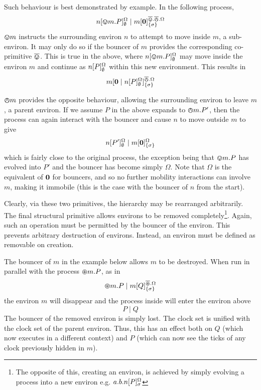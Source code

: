 \documentclass{acm_proc_article-sp}
\begin{document}
Such behaviour is best demonstrated by example.  In the following
 process,
\begin{displaymath}
{n}[ \varovee m.P ]^{\Omega}_{\emptyset} \mid {m}[ \textbf{0} ]^{\overline{\varovee}.\overline{\varowedge}.\Omega}_{\{\sigma\}}
\end{displaymath}
$\varovee m$ instructs the surrounding environ $n$ to attempt to move
inside $m$, a sub-environ. It may only do so if the bouncer of $m$
provides the corresponding co-primitive $\overline{\varovee}$.  This is true in the
above, where ${n}[ \varovee m.P ]^{\Omega}_{\emptyset}$ may move inside
the environ $m$ and continue as ${n}[ P ]^{\Omega}_{\emptyset}$ within
this new environment.  This results in
\begin{displaymath}
{m}[ \textbf{0} \mid {n}[ P ]^{\Omega}_{\emptyset} ]^{\overline{\varowedge}.\Omega}_{\{\sigma\}}
\end{displaymath}

$\varowedge m$ provides the opposite behaviour, allowing the surrounding
environ to leave $m$, a parent environ.  If we assume $P$ in the above
expands to $\varowedge m.P'$, then the process can again interact with the
bouncer and cause $n$ to move outside $m$ to give
\begin{displaymath}
{n}[ P' ]^{\Omega}_{\emptyset} \mid {m}[ \textbf{0} ]^{\Omega}_{\{\sigma\}}
\end{displaymath}
which is fairly close to the original process, the exception being that
$\varovee m.P$ has evolved into $P'$ and the bouncer has become simply
$\Omega$.  Note that $\Omega$ is the equivalent of $\textbf{0}$ for bouncers,
and so no further mobility interactions can involve $m$, making it
immobile (this is the case with the bouncer of $n$ from the start).

Clearly, via these two primitives, the hierarchy may be rearranged
arbitrarily.  The final structural primitive allows environs to be
removed completely\footnote{The opposite of this, creating an environ,
is achieved by simply evolving a process into a new environ
e.g. $a.b.{n}[ P ]^{\Omega}_{\sigma}$}.  Again, such an operation must
be permitted by the bouncer of the environ.  This prevents arbitrary
destruction of environs.  Instead, an environ must be defined as
removable on creation.

The bouncer of $m$ in the example below allows $m$ to be destroyed.
When run in parallel with the process $\varoast m.P$, as in
\begin{displaymath}
\varoast m.P \mid {m}[ Q ]^{\overline{\varoast}.\Omega}_{\{\sigma\}}
\end{displaymath}
the environ $m$ will disappear and the process inside will enter the
environ above
\begin{displaymath}
P \mid Q
\end{displaymath}
The bouncer of the removed environ is simply lost.  The clock set is
unified with the clock set of the parent environ.  Thus, this has an
effect both on $Q$ (which now executes in a different context) and $P$
(which can now see the ticks of any clock previously hidden in $m$).
\end{document}
